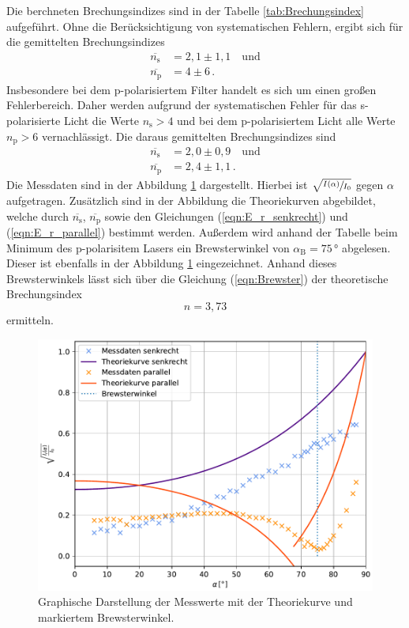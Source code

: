 Die berchneten Brechungsindizes sind in der Tabelle \ref{tab:Brechungsindex} aufgeführt. Ohne die Berücksichtigung von systematischen Fehlern, ergibt sich für die gemittelten Brechungsindizes
\begin{align*}
  \overline{n_{\text{s}}} &= 2,1\pm 1,1\quad \text{und}\\
  \overline{n_{\text{p}}} &= 4\pm 6\,.
\end{align*}
Insbesondere bei dem p-polarisiertem Filter handelt es sich um einen großen Fehlerbereich. Daher werden aufgrund der systematischen Fehler für das s-polarisierte Licht die Werte $n_{\text{s}} > 4$ und bei dem p-polarisiertem 
Licht alle Werte $n_{\text{p}} > 6$ vernachlässigt. Die daraus gemittelten Brechungsindizes sind
\begin{align*}
  \overline{n_{\text{s}}} &= 2,0\pm 0,9\quad \text{und}\\
  \overline{n_{\text{p}}} &= 2,4\pm 1,1\,.
\end{align*}
Die Messdaten sind in der Abbildung \ref{fig:plot} dargestellt. Hierbei ist $\sqrt{\sfrac{I(\alpha)}{I_0}}$ gegen $\alpha$ aufgetragen. Zusätzlich sind in der Abbildung
die Theoriekurven abgebildet, welche durch $\overline{n_{\text{s}}}$, $\overline{n_{\text{p}}}$ sowie den Gleichungen (\ref{eqn:E_r_senkrecht}) und (\ref{eqn:E_r_parallel}) bestimmt werden.
Außerdem wird anhand der Tabelle beim Minimum des p-polarisitem Lasers ein Brewsterwinkel von $\alpha_{\text{B}} = 75\,°$ abgelesen. Dieser ist ebenfalls in der Abbildung \ref{fig:plot} eingezeichnet.
Anhand dieses Brewsterwinkels lässt sich über die Gleichung (\ref{eqn:Brewster}) der theoretische Brechungsindex $$n = 3,73$$ ermitteln.
\begin{figure}[H]
  \includegraphics[width=\textwidth]{plot.pdf}
  \caption{Graphische Darstellung der Messwerte mit der Theoriekurve und markiertem Brewsterwinkel.}
  \label{fig:plot}
\end{figure}
